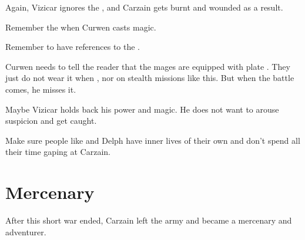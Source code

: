 \begin{changes}
  \begin{comment}
  \paragraph{The \Caliph Inviolate}
  \end{comment}
    Again, Vizicar ignores the , and Carzain gets burnt and wounded as a result. 
    
    Remember the  when Curwen casts magic. 
    
    Remember to have references to the . 
    
    Curwen needs to tell the reader that the \ishrah{} mages are equipped with plate \armour. 
    They just do not wear it when \travelling, nor on stealth missions like this. 
    But when the battle comes, he misses it. 
    
    Maybe Vizicar holds back his power and magic. 
    He does not want to arouse suspicion and get caught. 
  
  \begin{comment}\paragraph{\Tsekkect{} and Delph}\end{comment}
    Make sure people like \Tsekkect{} and Delph have inner lives of their own and don't spend all their time gaping at Carzain. 
\end{changes}
















\section{Mercenary}
After this short war ended, Carzain left the army and became a mercenary and adventurer.
























